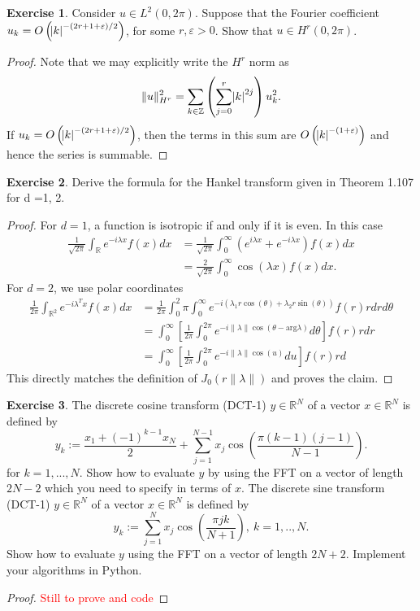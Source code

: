 \documentclass{amsart}
\theoremstyle{plain}
\theoremstyle{definition}
\newtheorem{exer}{Exercise}[section]
\newcommand{\R}{\mathbb{R}}
\newcommand{\Z}{\mathbb{Z}}
\newcommand{\tcr}[1]{\textcolor{red}{#1}}
\begin{document}
\begin{exer}
    Consider $u \in L^2(0,2\pi)$. Suppose that the Fourier coefficient $u_k = O\left(\abs{k}^{-(2r+1+\varepsilon)/2}\right) $, for some $r,\varepsilon >0$. Show that $u \in H^r (0,2\pi)$.
\end{exer}
\begin{proof}
Note that we may explicitly write the $H^r$ norm as 
$$\|u\|_{H^r}^2 = \sum_{k\in \Z}\left(\sum_{j=0}^r \abs{k}^{2j}\right)u_k^2.$$
If $u_k = O\left(\abs{k}^{-(2r+1+\varepsilon)/2}\right)$, then the terms in this sum are $O\left(\abs{k}^{-(1+\varepsilon)}\right)$ and hence the series is summable. 
\end{proof}

\begin{exer}
    Derive the formula for the Hankel transform given in Theorem 1.107 for d =1, 2.
\end{exer}
\begin{proof}
For $d=1$, a function is isotropic if and only if it is even. In this case
\begin{align*}
    \frac{1}{\sqrt{2\pi}}\int_{\R}e^{-i\lambda x}f(x) dx & = \frac{1}{\sqrt{2\pi}} \int_{0}^{\infty}\left(e^{i\lambda x}+e^{-i\lambda x}\right) f(x) dx \\
    & = \frac{2}{\sqrt{2\pi}} \int_0^\infty \cos(\lambda x) f(x)dx.
\end{align*}
For $d=2$, we use polar coordinates
\begin{align*}
    \frac{1}{2\pi}\int_{\R^2}e^{-i\lambda^T x}f(x) dx &=\frac{1}{2\pi}\int_{0}^2\pi \int_0^\infty e^{-i\left(\lambda_1 r\cos(\theta) + \lambda_2 r\sin(\theta) \right)}f(r)r dr d\theta \\
    & = \int_0^\infty \left[\frac{1}{2\pi} \int_0^{2\pi} e^{-i \|\lambda\| \cos\left(\theta-\text{arg}\lambda\right)} d\theta \right] f(r)r dr\\
    &=  \int_0^\infty \left[\frac{1}{2\pi} \int_0^{2\pi} e^{-i \|\lambda\| \cos\left(u\right)} du\right] f(r)r d
\end{align*}
This directly matches the definition of $J_0\left(r\|\lambda\|\right)$ and proves the claim.
\end{proof}

\begin{exer}
    The discrete cosine transform (DCT-1) $y\in \R^N$ of a vector $x \in \R^N$ is defined by
    $$y_k := \frac{x_1 + \left(-1\right)^{k-1}x_N}{2} + \sum_{j=1}^{N-1} x_j \cos\left(\frac{\pi(k-1)(j-1)}{N-1}\right).$$
    for $k=1,...,N$. Show how to evaluate $y$ by using the FFT on a vector of length $2N-2$ which you need to specify in terms of $x$.
     The discrete sine transform (DCT-1) $y\in \R^N$ of a vector $x \in \R^N$ is defined by
     $$y_k := \sum_{j=1}^{N} x_j \cos\left(\frac{\pi jk}{N+1}\right), \ k=1,..,N.$$
     Show how to evaluate $y$ using the FFT on a vector of length $2N+2$. Implement your algorithms in Python. 
\end{exer}
\begin{proof}
    \tcr{Still to prove and code}
\end{proof}
\end{document}
